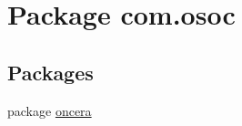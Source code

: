 \hypertarget{namespacecom_1_1osoc}{}\section{Package com.\+osoc}
\label{namespacecom_1_1osoc}
\subsection*{Packages}
\begin{DoxyCompactItemize}
\item 
package \mbox{\hyperlink{namespacecom_1_1osoc_1_1oncera}{oncera}}
\end{DoxyCompactItemize}

